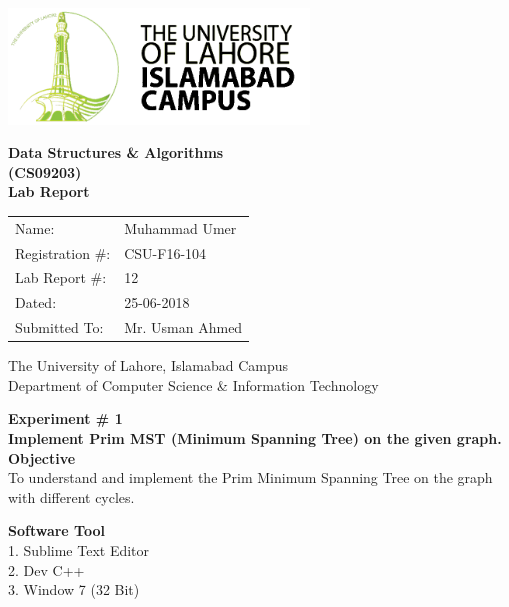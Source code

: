 \documentclass[11pt]{article}            %
\begin{document}
\begin{titlepage}
    \centering
  \vfill
    \includegraphics[width=8cm]{uni_logo.png} \\ 
	\vskip2cm
    {\bfseries\Large
	Data Structures  \& Algorithms \\ (CS09203)\\
	
	\vskip2cm
	Lab Report 
	 
	\vskip2cm
	}    

\begin{center}
\begin{tabular}{ l l  } 

Name: & Muhammad Umer \\ 
Registration \#: & CSU-F16-104 \\ 
Lab Report \#: & 12 \\ 
 Dated:& 25-06-2018\\ 
Submitted To:& Mr. Usman Ahmed\\ 

\end{tabular}
\end{center}
    \vfill
    The University of Lahore, Islamabad Campus\\
Department of Computer Science \& Information Technology
\end{titlepage}


    
    {\bfseries\Large
\centering
	Experiment \# 1 \\

Implement Prim MST (Minimum Spanning Tree) on the given graph.\\
	
	}    
 \vskip1cm
 \textbf {Objective}\\  To understand and implement the Prim Minimum Spanning Tree on the graph with different cycles.
 
 \textbf {Software Tool} \\
1. Sublime Text Editor\\
2. Dev C++\\
3. Window 7 (32 Bit)\\
\end{document}
